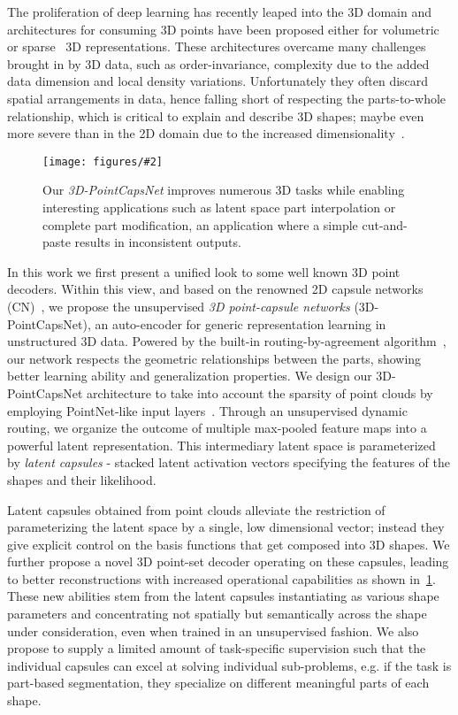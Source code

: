 \documentclass[10pt,twocolumn,letterpaper]{article}
\theoremstyle{break}
\newcommand{\insertimageC}[5]{ \begin{figure}[#5]
\centering
\texttt{[image: figures/\#2]}
\caption{#3}
\label{#4}
\end{figure}
}
\begin{document}
The proliferation of deep learning has recently leaped into the 3D domain and architectures for consuming 3D points have been proposed either for volumetric~\cite{Riegler2017CVPR} or sparse~\cite{qi2017pointnet} 3D representations. These architectures overcame many challenges brought in by 3D data, such as order-invariance, complexity due to the added data dimension and local density variations. Unfortunately they often discard spatial arrangements in data, hence falling short of respecting the parts-to-whole relationship, which is critical to explain and describe 3D shapes; maybe even more severe than in the 2D domain due to the increased dimensionality~\cite{bellman2013dynamic}. 
\insertimageC{1}{teaser2_cropped.pdf}{Our \textit{3D-PointCapsNet} improves numerous 3D tasks while enabling interesting applications such as latent space part interpolation or complete part modification, an application where a simple cut-and-paste results in inconsistent outputs.\vspace{-5mm}}{fig:teaser}{t!}



In this work we first present a unified look to some well known 3D point decoders. Within this view, and based on the renowned 2D capsule networks (CN)~\cite{sabour2017dynamic}, we propose the unsupervised \textit{3D point-capsule networks} (3D-PointCapsNet), an auto-encoder for generic representation learning in unstructured 3D data. Powered by the built-in routing-by-agreement algorithm~\cite{sabour2017dynamic}, our network respects the geometric relationships between the parts, showing better learning ability and generalization properties. We design our 3D-PointCapsNet architecture to take into account the sparsity of point clouds by employing PointNet-like input layers~\cite{qi2017pointnet}. Through an unsupervised dynamic routing, we organize the outcome of multiple max-pooled feature maps into a powerful latent representation. This intermediary latent space is parameterized by \textit{latent capsules} - stacked latent activation vectors specifying the features of the shapes and their likelihood.

Latent capsules obtained from point clouds alleviate the restriction of parameterizing the latent space by a single, low dimensional vector; instead they give explicit control on the basis functions that get composed into 3D shapes.
We further propose a novel 3D point-set decoder operating on these capsules, leading to better reconstructions with increased operational capabilities as shown in~\cref{fig:teaser}. These new abilities stem from the latent capsules instantiating as various shape parameters and concentrating not spatially but semantically across the shape under consideration, even when trained in an unsupervised fashion. We also propose to supply a limited amount of task-specific supervision such that the individual capsules can excel at solving individual sub-problems, e.g. if the task is part-based segmentation, they specialize on different meaningful parts of each shape.
\end{document}
